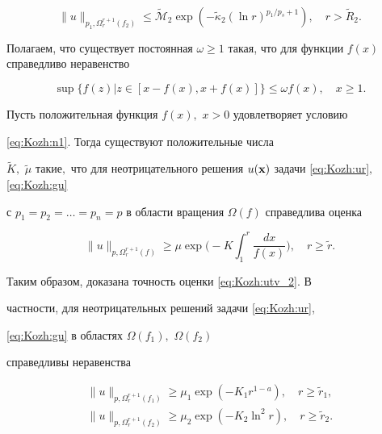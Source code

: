 $$

\|u\|_{p_1,\Omega_r^{r+1}(f_2)}\leq

\widetilde{\mathcal{M}}_2 \exp\left(-\widetilde{\kappa}_2 (\ln r)^{p_1/p_s+1}\right), \quad r>\widetilde{R}_2.

$$



Полагаем, что существует постоянная $\omega\geq 1$ такая, что для функции $f(x)$ справедливо неравенство

\begin{equation}

\sup \{f(z)|z\in [x-f(x),x+f(x)]\}\leq \omega f(x), \quad x\geq 1.\label{eq:Kozh:n1}

\end{equation}



\smallskip



\begin{theorem}[2]Пусть положительная функция $f(x),$ $x>0$ удовлетворяет условию

\eqref{eq:Kozh:n1}$.$ Тогда существуют положительные числа

$\widetilde{K},$ $\widetilde{\mu}$ такие$,$ что для неотрицательного решения $u({\bf x})$ задачи \eqref{eq:Kozh:ur}$,$ \eqref{eq:Kozh:gu}

с $p_1=p_2= \ldots =p_n=p$ в области вращения $\Omega(f)$ справедлива оценка

\begin{equation}

\|u\|_{p,\Omega_r^{r+1}(f)}\geq \mu\exp\biggl(-K\int_1^r\frac{dx}{f(x)}\biggr),

\quad r\geq \widetilde{r}.\label{eq:Kozh:teorem_4}

\end{equation}

\end{theorem}



\smallskip

Таким образом, доказана точность оценки \eqref{eq:Kozh:utv_2}. В

частности, для неотрицательных решений задачи \eqref{eq:Kozh:ur},

\eqref{eq:Kozh:gu} в областях $\Omega(f_1),$ $\Omega(f_2)$

справедливы неравенства

\begin{gather*}

\|u\|_{p,\Omega_r^{r+1}(f_1)}\geq \mu_1 \exp\left(-K_1

r^{1-a}\right), \quad r\geq \widetilde{r}_1,\\

\|u\|_{p,\Omega_r^{r+1}(f_2)}\geq\mu_2\exp\left(-K_2\ln ^2

r\right), \quad r\geq \widetilde{r}_2.

\end{gather*}



